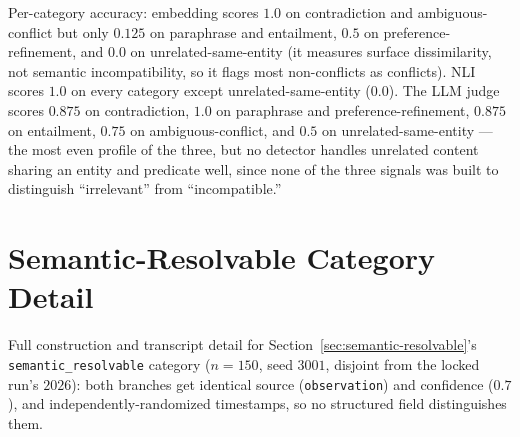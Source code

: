 \documentclass[11pt]{article}
\begin{document}
\begin{table}[H]
  \centering
  \small
  \caption{Balanced detector benchmark ($48$ pairs, $16$ conflict / $32$
  non-conflict). $^\dagger$LLM judge emits a binary score only, so its
  AUROC collapses to a single operating point rather than a true ranked
  curve; reported for completeness, not read as equivalent to the
  continuous-score detectors' AUROC.}
  \label{tab:detectors-balanced}
\end{table}

Per-category accuracy: embedding scores $1.0$ on contradiction and
ambiguous-conflict but only $0.125$ on paraphrase and entailment, $0.5$ on
preference-refinement, and $0.0$ on unrelated-same-entity (it measures
surface dissimilarity, not semantic incompatibility, so it flags most
non-conflicts as conflicts). NLI scores $1.0$ on every category except
unrelated-same-entity ($0.0$). The LLM judge scores $0.875$ on
contradiction, $1.0$ on paraphrase and preference-refinement, $0.875$ on
entailment, $0.75$ on ambiguous-conflict, and $0.5$ on unrelated-same-entity
--- the most even profile of the three, but no detector handles unrelated
content sharing an entity and predicate well, since none of the three
signals was built to distinguish ``irrelevant'' from ``incompatible.''

\section{Semantic-Resolvable Category Detail}
\label{sec:semantic-resolvable-detail}

Full construction and transcript detail for Section~\ref{sec:semantic-resolvable}'s
\texttt{semantic\_resolvable} category ($n{=}150$, seed $3001$, disjoint
from the locked run's $2026$): both branches get identical source
(\texttt{observation}) and confidence ($0.7$), and independently-randomized
timestamps, so no structured field distinguishes them.
\end{document}
